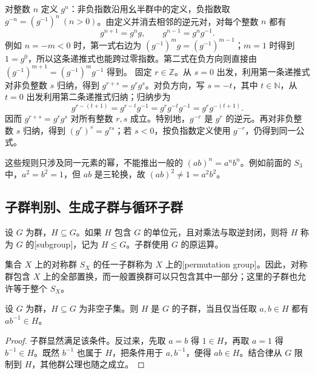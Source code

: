 \ProseParagraphBreak
对整数 \(n\) 定义 \(g^n\)：非负指数沿用幺半群中的定义，负指数取 \(g^{-n}=(g^{-1})^n\ (n>0)\)。由定义并消去相邻的逆元对，对每个整数 \(n\) 都有
\[
	g^{n+1}=g^ng,\qquad g^{n-1}=g^ng^{-1}.
\]
例如 \(n=-m<0\) 时，第一式右边为 \((g^{-1})^m g=(g^{-1})^{m-1}\)；\(m=1\) 时得到 \(1=g^0\)，所以这条递推式也能跨过零指数。第二式在负方向则直接由 \((g^{-1})^{m+1}=(g^{-1})^m g^{-1}\) 得到。 固定 \(r\in\mathbb Z\)。从 \(s=0\) 出发，利用第一条递推式对非负整数 \(s\) 归纳，得到 \(g^{r+s}=g^rg^s\)。对负方向，写 \(s=-t\)，其中 \(t\in\mathbb N\)，从 \(t=0\) 出发利用第二条递推式归纳；归纳步为
\[
	g^{r-(t+1)}=g^{r-t}g^{-1} =g^rg^{-t}g^{-1}=g^rg^{-(t+1)}.
\]
因而 \(g^{r+s}=g^rg^s\) 对所有整数 \(r,s\) 成立。特别地，\(g^{-r}\) 是 \(g^r\) 的逆元。再对非负整数 \(s\) 归纳，得到 \((g^r)^s=g^{rs}\)；若 \(s<0\)，按负指数定义使用 \(g^{-r}\)，仍得到同一公式。

\ProseParagraphBreak
这些规则只涉及同一元素的幂，不能推出一般的 \((ab)^n=a^nb^n\)。例如前面的 \(S_3\) 中，\(a^2=b^2=1\)，但 \(ab\) 是三轮换，故 \((ab)^2\ne1=a^2b^2\)。

\subsection{子群判别、生成子群与循环子群}
\label{b1:subsec:0201:02}

\begin{definition}\label{b1:def:subgroup}
	设 \(G\) 为群，\(H\subseteq G\)。如果 \(H\) 包含 \(G\) 的单位元，且对乘法与取逆封闭，则将 \(H\) 称为 \(G\) 的[subgroup]，记为 \(H\leq G\)。子群使用 \(G\) 的原运算。
\end{definition}


集合 \(X\) 上的对称群 \(S_X\) 的任一子群称为 \(X\) 上的[permutation group]。因此，对称群包含 \(X\) 上的全部置换，而一般置换群可以只包含其中一部分；这里的子群也允许等于整个 \(S_X\)。

\begin{proposition}[子群判别]\label{b1:prop:subgroup-test}
	设 \(G\) 为群，\(H\subseteq G\) 为非空子集。则 \(H\) 是 \(G\) 的子群，当且仅当任取 \(a,b\in H\) 都有 \(ab^{-1}\in H\)。
\end{proposition}

\begin{proof}
	子群显然满足该条件。反过来，先取 \(a=b\) 得 \(1\in H\)，再取 \(a=1\) 得 \(b^{-1}\in H\)。既然 \(b^{-1}\) 也属于 \(H\)，把条件用于 \(a,b^{-1}\)，便得 \(ab\in H\)。结合律从 \(G\) 限制到 \(H\)，其他群公理也随之成立。
\end{proof}

